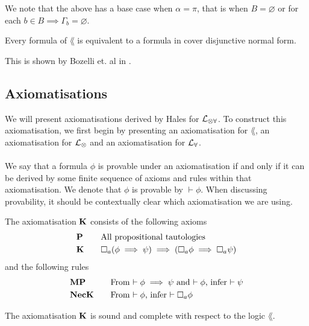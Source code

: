 We note that the above has a base case when $\alpha = \pi$, that is when $B = \varnothing$ or for
each $b \in B \implies \Gamma_b = \varnothing$.

\begin{lemma} \label{allInCoverNormal}
Every formula of $\lang$ is equivalent to a formula in cover disjunctive normal form.
\end{lemma}

This is shown by Bozelli et. al in \cite{DBLPjournalscorrabs12023538}.

\subsection{Axiomatisations}
We will present axiomatisations derived by Hales for $\mathcal{L}_{\otimes\forall}$.
To construct this axiomatisation, we first begin by presenting an axiomatisation for $\lang$, an
axiomatisation for $\mathcal{L}_{\otimes}$ and an axiomatisation for $\mathcal{L}_{\forall}$.\\
\\
We say that a formula $\phi$ is provable under an axiomatisation if and only if it can be derived by
some finite sequence of axioms and rules within that axiomatisation.
We denote that $\phi$ is provable by $\vdash \phi$.
When discussing provability, it should be contextually clear which axiomatisation we are using.

\begin{defn} \label{axiomK}
The axiomatisation $\bf K$ consists of the following axioms
\begin{alignat*}{2}
	& \bf P && \quad \text{All propositional tautologies} \\
	& \bf K && \quad \Box_a(\phi \implies \psi) \implies (\Box_a \phi \implies \Box_a \psi)
\end{alignat*}
and the following rules
\begin{alignat*}{2}
	& \bf MP && \quad \text{From $\vdash \phi \implies \psi$ and $\vdash \phi$, infer $\vdash \psi$} \\
	& \bf NecK && \quad \text{From $\vdash \phi$, infer $\vdash \Box_a \phi$}
\end{alignat*}
\end{defn}

\begin{lemma} \label{axiomKSoundComplete}
The axiomatisation $\bf K$ is sound and complete with respect to the logic $\lang$.
\end{lemma}

